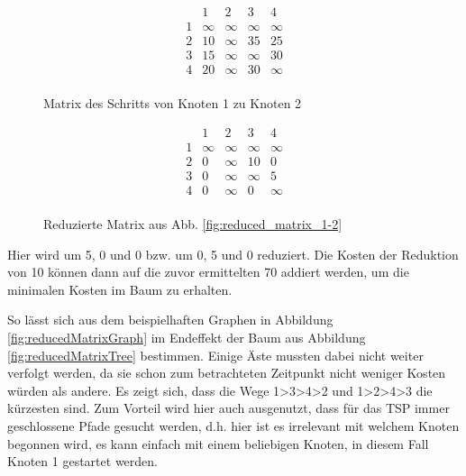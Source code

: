 \begin{figure}[H]
\centering
\begin{minipage}{.5\textwidth}
  \centering
  \[
    \begin{matrix}
          & 1 & 2 & 3 & 4\\
        1 & \infty & \infty & \infty & \infty\\
        2 & 10 & \infty & 35 & 25\\
        3 & 15 & \infty & \infty & 30\\
        4 & 20 & \infty & 30 & \infty\\
    \end{matrix}
    \]
    \caption{Matrix des Schritts von Knoten 1 zu Knoten 2 \cite{geeksForGeeksRm}}
    \label{fig:reduced_matrix_1-2}
\end{minipage}%
\begin{minipage}{.5\textwidth}
  \centering
   \[
    \begin{matrix}
          & 1 & 2 & 3 & 4\\
        1 & \infty & \infty & \infty & \infty\\
        2 & 0 & \infty & 10 & 0\\
        3 & 0 & \infty & \infty & 5\\
        4 & 0 & \infty & 0 & \infty\\
    \end{matrix}
    \]
    \caption{Reduzierte Matrix aus Abb. \ref{fig:reduced_matrix_1-2} \cite{geeksForGeeksRm}}
    \label{fig:reduced_matrix_1-2_reduced}
\end{minipage}
\end{figure}


Hier wird um 5, 0 und 0 bzw. um 0, 5 und 0 reduziert. Die Kosten der Reduktion von 10 können dann auf die zuvor ermittelten 70 addiert werden, um die minimalen Kosten im Baum zu erhalten.


So lässt sich aus dem beispielhaften Graphen in Abbildung \ref{fig:reducedMatrixGraph} im Endeffekt der Baum aus Abbildung \ref{fig:reducedMatrixTree} bestimmen. Einige Äste mussten dabei nicht weiter verfolgt werden, da sie schon zum betrachteten Zeitpunkt nicht weniger Kosten würden als andere. Es zeigt sich, dass die Wege 1\textgreater{}3\textgreater{}4\textgreater{}2 und 1\textgreater{}2\textgreater{}4\textgreater{}3 die kürzesten sind. Zum Vorteil wird hier auch ausgenutzt, dass für das TSP immer geschlossene Pfade gesucht werden, d.h. hier ist es irrelevant mit welchem Knoten begonnen wird, es kann einfach mit einem beliebigen Knoten, in diesem Fall Knoten 1 gestartet werden. \cite{geeksForGeeksRm}

